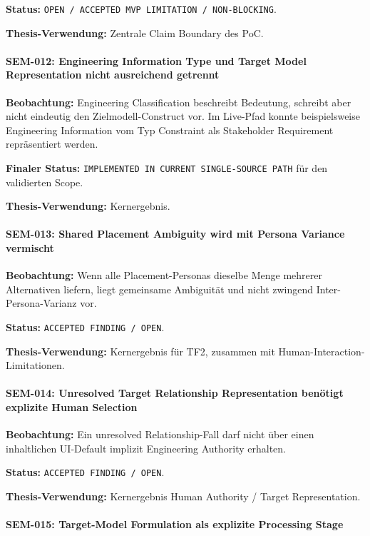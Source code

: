 \textbf{Status:}
\texttt{OPEN / ACCEPTED MVP LIMITATION / NON-BLOCKING}.

\textbf{Thesis-Verwendung:}
Zentrale Claim Boundary des PoC.


\paragraph{SEM-012: Engineering Information Type und Target Model Representation nicht ausreichend getrennt}

\textbf{Beobachtung:}
Engineering Classification beschreibt Bedeutung, schreibt aber nicht eindeutig
den Zielmodell-Construct vor. Im Live-Pfad konnte beispielsweise Engineering
Information vom Typ Constraint als Stakeholder Requirement repräsentiert werden.

\textbf{Finaler Status:}
\texttt{IMPLEMENTED IN CURRENT SINGLE-SOURCE PATH} für den validierten Scope.

\textbf{Thesis-Verwendung:}
Kernergebnis.


\paragraph{SEM-013: Shared Placement Ambiguity wird mit Persona Variance vermischt}

\textbf{Beobachtung:}
Wenn alle Placement-Personas dieselbe Menge mehrerer Alternativen liefern, liegt
gemeinsame Ambiguität und nicht zwingend Inter-Persona-Varianz vor.

\textbf{Status:}
\texttt{ACCEPTED FINDING / OPEN}.

\textbf{Thesis-Verwendung:}
Kernergebnis für TF2, zusammen mit Human-Interaction-Limitationen.


\paragraph{SEM-014: Unresolved Target Relationship Representation benötigt explizite Human Selection}

\textbf{Beobachtung:}
Ein unresolved Relationship-Fall darf nicht über einen inhaltlichen UI-Default
implizit Engineering Authority erhalten.

\textbf{Status:}
\texttt{ACCEPTED FINDING / OPEN}.

\textbf{Thesis-Verwendung:}
Kernergebnis Human Authority / Target Representation.


\paragraph{SEM-015: Target-Model Formulation als explizite Processing Stage}

